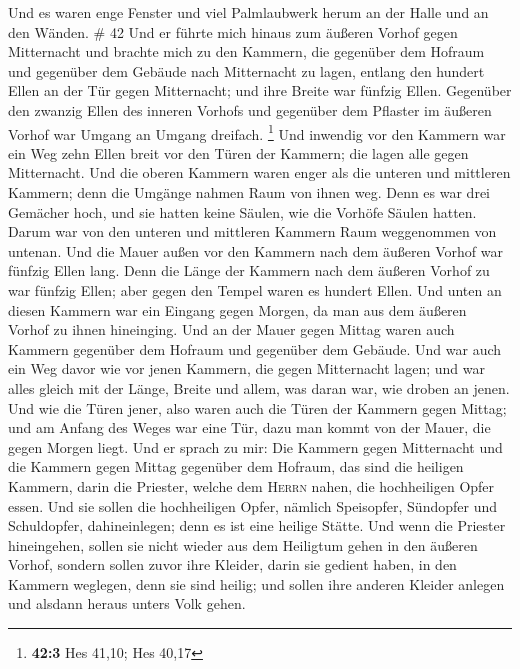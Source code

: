  Und es waren enge Fenster und viel Palmlaubwerk herum an
der Halle und an den Wänden. \# 42  Und er führte mich
hinaus zum äußeren Vorhof gegen Mitternacht und brachte mich zu den
Kammern, die gegenüber dem Hofraum und gegenüber dem Gebäude nach
Mitternacht zu lagen,  entlang den hundert Ellen an der
Tür gegen Mitternacht; und ihre Breite war fünfzig Ellen. 
Gegenüber den zwanzig Ellen des inneren Vorhofs und gegenüber dem
Pflaster im äußeren Vorhof war Umgang an Umgang dreifach. \footnote{\textbf{42:3}
  Hes 41,10; Hes 40,17}  Und inwendig vor den Kammern war
ein Weg zehn Ellen breit vor den Türen der Kammern; die lagen alle gegen
Mitternacht.  Und die oberen Kammern waren enger als die
unteren und mittleren Kammern; denn die Umgänge nahmen Raum von ihnen
weg.  Denn es war drei Gemächer hoch, und sie hatten keine
Säulen, wie die Vorhöfe Säulen hatten. Darum war von den unteren und
mittleren Kammern Raum weggenommen von untenan.  Und die
Mauer außen vor den Kammern nach dem äußeren Vorhof war fünfzig Ellen
lang.  Denn die Länge der Kammern nach dem äußeren Vorhof
zu war fünfzig Ellen; aber gegen den Tempel waren es hundert Ellen.
 Und unten an diesen Kammern war ein Eingang gegen Morgen,
da man aus dem äußeren Vorhof zu ihnen hineinging.  Und
an der Mauer gegen Mittag waren auch Kammern gegenüber dem Hofraum und
gegenüber dem Gebäude.  Und war auch ein Weg davor wie
vor jenen Kammern, die gegen Mitternacht lagen; und war alles gleich mit
der Länge, Breite und allem, was daran war, wie droben an jenen.
 Und wie die Türen jener, also waren auch die Türen der
Kammern gegen Mittag; und am Anfang des Weges war eine Tür, dazu man
kommt von der Mauer, die gegen Morgen liegt.  Und er
sprach zu mir: Die Kammern gegen Mitternacht und die Kammern gegen
Mittag gegenüber dem Hofraum, das sind die heiligen Kammern, darin die
Priester, welche dem \textsc{Herrn} nahen, die hochheiligen Opfer essen.
Und sie sollen die hochheiligen Opfer, nämlich Speisopfer, Sündopfer und
Schuldopfer, dahineinlegen; denn es ist eine heilige Stätte.
 Und wenn die Priester hineingehen, sollen sie nicht
wieder aus dem Heiligtum gehen in den äußeren Vorhof, sondern sollen
zuvor ihre Kleider, darin sie gedient haben, in den Kammern weglegen,
denn sie sind heilig; und sollen ihre anderen Kleider anlegen und
alsdann heraus unters Volk gehen.

